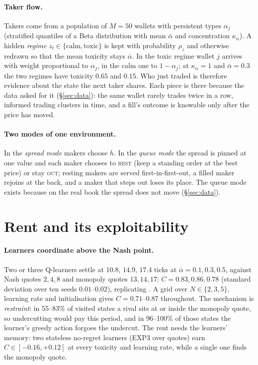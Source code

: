 \documentclass[11pt]{article}
\begin{document}
\paragraph{Taker flow.} Takers come from a population of $M=50$ wallets with persistent types $\alpha_j$ (stratified quantiles of a Beta distribution with mean $\bar\alpha$ and concentration $\kappa_\alpha$). A hidden \emph{regime} $z_t\in\{\text{calm},\text{toxic}\}$ is kept with probability $\rho_z$ and otherwise redrawn so that the mean toxicity stays $\bar\alpha$. In the toxic regime wallet $j$ arrives with weight proportional to $\alpha_j$, in the calm one to $1-\alpha_j$; at $\kappa_\alpha=1$ and $\bar\alpha=0.3$ the two regimes have toxicity $0.65$ and $0.15$. Who just traded is therefore evidence about the state the next taker shares. Each piece is there because the data asked for it (\S\ref{sec:data}): the same wallet rarely trades twice in a row, informed trading clusters in time, and a fill's outcome is knowable only after the price has moved.

\paragraph{Two modes of one environment.} In the \emph{spread mode} makers choose $h$. In the \emph{queue mode} the spread is pinned at one value and each maker chooses to \textsc{rest} (keep a standing order at the best price) or stay \textsc{out}; resting makers are served first-in-first-out, a filled maker rejoins at the back, and a maker that steps out loses its place. The queue mode exists because on the real book the spread does not move (\S\ref{sec:data}).

\section{Rent and its exploitability}\label{sec:rq2}

\paragraph{Learners coordinate above the Nash point.} Two or three Q-learners settle at $10.8$, $14.9$, $17.4$ ticks at $\bar\alpha=0.1,0.3,0.5$, against Nash quotes $2,4,8$ and monopoly quotes $13,14,17$: $C=0.83,0.86,0.78$ (standard deviation over ten seeds $0.01$--$0.02$), replicating \cite{cfl}. A grid over $N\in\{2,3,5\}$, learning rate and initialisation gives $C=0.71$--$0.87$ throughout. The mechanism is \emph{restraint}: in 55--83\% of visited states a rival sits at or inside the monopoly quote, so undercutting would pay this period, and in 96--100\% of those states the learner's greedy action forgoes the undercut. The rent needs the learners' memory: two stateless no-regret learners (EXP3 over quotes) earn $C\in[-0.16,+0.12]$ at every toxicity and learning rate, while a single one finds the monopoly quote.
\end{document}
